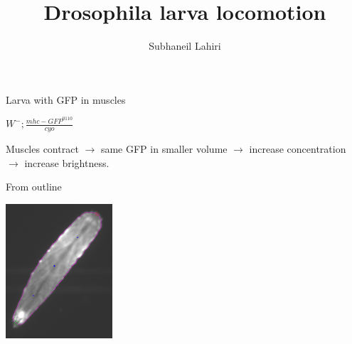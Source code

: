 \documentclass{beamer}
\title{Drosophila larva locomotion}
\author{Subhaneil Lahiri}
\institute[Harvard]{%
Harvard University
}
\begin{document}

\begin{frame}
%
 \titlepage
%
\end{frame}

%



\begin{frame}{Larva with GFP in muscles}
%
 \begin{center}
 $W^-; \frac{mhc-GFP^{0110}}{cyo}$

 \end{center}

 \vp Muscles contract $\rightarrow$ same GFP in smaller volume $\rightarrow$ increase
 concentration $\rightarrow$ increase brightness.

%
\end{frame}



\begin{frame}{From outline}
%
%
\begin{center}
 \parbox{5cm}{\includegraphics[height=5cm]{larva.png}}
 \parbox{5cm}{\\
    }
\end{center}
%
%
\end{frame}
\end{document}
